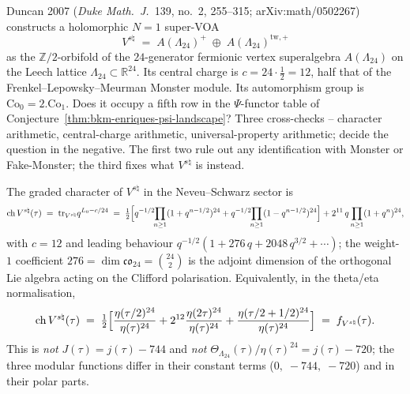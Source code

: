 Duncan 2007 (\emph{Duke Math.\ J.}~139, no.~2, 255--315;
arXiv:math/0502267) constructs a holomorphic $N{=}1$ super-VOA
\[
 V^{s\natural}
 \;=\;
 A(\Lambda_{24})^{+}\;\oplus\;A(\Lambda_{24})^{\mathrm{tw},+}
\]
as the $\mathbb{Z}/2$-orbifold of the $24$-generator fermionic vertex
superalgebra $A(\Lambda_{24})$ on the Leech lattice
$\Lambda_{24}\subset\mathbb{R}^{24}$. Its central charge is
$c = 24\cdot\tfrac{1}{2} = 12$, half that of the Frenkel--Lepowsky--Meurman
Monster module. Its automorphism group is $\mathrm{Co}_0 =
2.\mathrm{Co}_1$. Does it occupy a fifth row in the $\Psi$-functor
table of Conjecture~\ref{thm:bkm-enriques-psi-landscape}? Three cross-checks
-- character arithmetic, central-charge arithmetic, universal-property
arithmetic; decide the question in the negative. The first two
rule out any identification with Monster or Fake-Monster; the third
fixes what $V^{s\natural}$ is instead.

\begin{theorem}
\label{thm:bkm-conway-character-chain}
The graded character of $V^{s\natural}$ in the Neveu--Schwarz sector is
\[
 \mathrm{ch}\,V^{s\natural}(\tau)
 \;=\;
 \mathrm{tr}_{V^{s\natural}}q^{L_0 - c/24}
 \;=\;
 \tfrac{1}{2}\Bigl[
 q^{-1/2}\!\!\prod_{n\ge 1}(1+q^{n-1/2})^{24}
 + q^{-1/2}\!\!\prod_{n\ge 1}(1-q^{n-1/2})^{24}
 \Bigr]
 + 2^{11}\,q\prod_{n\ge 1}(1+q^n)^{24},
\]
with $c = 12$ and leading behaviour $q^{-1/2}(1 + 276\,q + 2048\,q^{3/2} +
\cdots)$; the weight-$1$ coefficient $276 = \dim\mathfrak{co}_{24}
= \binom{24}{2}$ is the adjoint dimension of the orthogonal Lie algebra
acting on the Clifford polarisation. Equivalently, in the theta/eta
normalisation,
\[
 \mathrm{ch}\,V^{s\natural}(\tau)
 \;=\;
 \tfrac{1}{2}\Bigl[
 \frac{\eta(\tau/2)^{24}}{\eta(\tau)^{24}}
 + 2^{12}\frac{\eta(2\tau)^{24}}{\eta(\tau)^{24}}
 + \frac{\eta(\tau/2+1/2)^{24}}{\eta(\tau)^{24}}
 \Bigr]
 \;=\;
 f_{V^{s\natural}}(\tau).
\]
This is \emph{not} $J(\tau) = j(\tau) - 744$ and \emph{not}
$\Theta_{\Lambda_{24}}(\tau)/\eta(\tau)^{24} = j(\tau) - 720$; the three
modular functions differ in their constant terms ($0,\;-744,\;-720$) and
in their polar parts.
\end{theorem}

